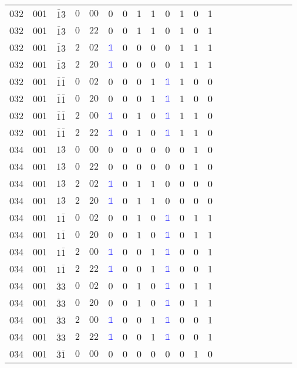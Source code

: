 \begin{longtable*}{c| cccccccccccccccccccc }
032& 001& $\bar{1}3$& $0$& $00$& 0& 0& 1& 1& 0& 1& 0& 1\\
032& 001& $\bar{1}3$& $0$& $22$& 0& 0& 1& 1& 0& 1& 0& 1\\
032& 001& $\bar{1}3$& $2$& $02$& \textcolor{blue}{$\mathds{1}$}& 0& 0& 0& 0& 1& 1& 1\\
032& 001& $\bar{1}3$& $2$& $20$& \textcolor{blue}{$\mathds{1}$}& 0& 0& 0& 0& 1& 1& 1\\
032& 001& $\bar{1}\bar{1}$& $0$& $02$& 0& 0& 0& 1& \textcolor{blue}{$\mathds{1}$}& 1& 0& 0\\
032& 001& $\bar{1}\bar{1}$& $0$& $20$& 0& 0& 0& 1& \textcolor{blue}{$\mathds{1}$}& 1& 0& 0\\
032& 001& $\bar{1}\bar{1}$& $2$& $00$& \textcolor{blue}{$\mathds{1}$}& 0& 1& 0& \textcolor{blue}{$\mathds{1}$}& 1& 1& 0\\
032& 001& $\bar{1}\bar{1}$& $2$& $22$& \textcolor{blue}{$\mathds{1}$}& 0& 1& 0& \textcolor{blue}{$\mathds{1}$}& 1& 1& 0\\
034& 001& $13$& $0$& $00$& 0& 0& 0& 0& 0& 0& 1& 0\\
034& 001& $13$& $0$& $22$& 0& 0& 0& 0& 0& 0& 1& 0\\
034& 001& $13$& $2$& $02$& \textcolor{blue}{$\mathds{1}$}& 0& 1& 1& 0& 0& 0& 0\\
034& 001& $13$& $2$& $20$& \textcolor{blue}{$\mathds{1}$}& 0& 1& 1& 0& 0& 0& 0\\
034& 001& $1\bar{1}$& $0$& $02$& 0& 0& 1& 0& \textcolor{blue}{$\mathds{1}$}& 0& 1& 1\\
034& 001& $1\bar{1}$& $0$& $20$& 0& 0& 1& 0& \textcolor{blue}{$\mathds{1}$}& 0& 1& 1\\
034& 001& $1\bar{1}$& $2$& $00$& \textcolor{blue}{$\mathds{1}$}& 0& 0& 1& \textcolor{blue}{$\mathds{1}$}& 0& 0& 1\\
034& 001& $1\bar{1}$& $2$& $22$& \textcolor{blue}{$\mathds{1}$}& 0& 0& 1& \textcolor{blue}{$\mathds{1}$}& 0& 0& 1\\
034& 001& $\bar{3}3$& $0$& $02$& 0& 0& 1& 0& \textcolor{blue}{$\mathds{1}$}& 0& 1& 1\\
034& 001& $\bar{3}3$& $0$& $20$& 0& 0& 1& 0& \textcolor{blue}{$\mathds{1}$}& 0& 1& 1\\
034& 001& $\bar{3}3$& $2$& $00$& \textcolor{blue}{$\mathds{1}$}& 0& 0& 1& \textcolor{blue}{$\mathds{1}$}& 0& 0& 1\\
034& 001& $\bar{3}3$& $2$& $22$& \textcolor{blue}{$\mathds{1}$}& 0& 0& 1& \textcolor{blue}{$\mathds{1}$}& 0& 0& 1\\
034& 001& $\bar{3}\bar{1}$& $0$& $00$& 0& 0& 0& 0& 0& 0& 1& 0\\

\end{longtable*}
